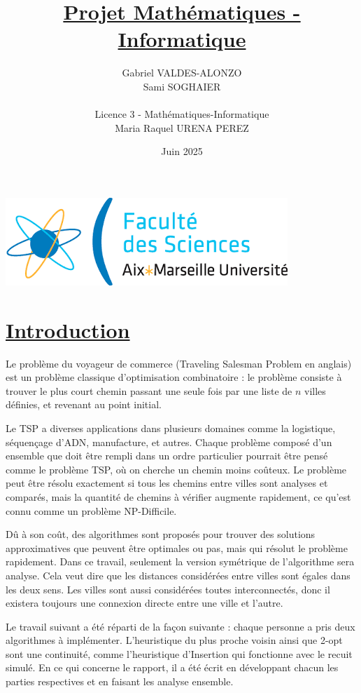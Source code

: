 \documentclass[a4paper,11pt,fleqn]{article}
\title{\underline{Projet Mathématiques - Informatique}}
\author{Gabriel VALDES-ALONZO\\ Sami SOGHAIER  \\\\ Licence 3 - Mathématiques-Informatique \\ Maria Raquel URENA PEREZ }
\date{Juin 2025}
\begin{document}
\maketitle
\begin{center}
    \includegraphics[scale=0.7]{index.png}
\end{center}

\newpage
{}

\section*{\underline{Introduction}}
Le problème du voyageur de commerce \cite{book:TSP,chap:TSP} (Traveling Salesman Problem en anglais) est un problème classique d’optimisation combinatoire : le problème consiste à trouver le plus court chemin passant une seule fois par une liste de $n$ villes définies, et revenant au point initial.

Le TSP a diverses applications dans plusieurs domaines comme la logistique, séquençage d'ADN, manufacture, et autres. Chaque problème composé d'un ensemble que doit être rempli dans un ordre particulier pourrait être pensé comme le problème TSP, où on cherche un chemin moins coûteux. Le problème peut être résolu exactement si tous les chemins entre villes sont analyses et comparés, mais la quantité de chemins à vérifier augmente rapidement, ce qu'est connu comme un problème NP-Difficile.

Dû à son coût, des algorithmes sont proposés pour trouver des solutions approximatives que peuvent être optimales ou pas, mais qui résolut le problème rapidement. Dans ce travail, seulement la version symétrique de l'algorithme sera analyse. Cela veut dire que les distances considérées entre villes sont égales dans les deux sens. Les villes sont aussi considérées toutes interconnectés, donc il existera toujours une connexion directe entre une ville et l'autre.

Le travail suivant a été réparti de la façon suivante : chaque personne a pris deux algorithmes à implémenter. L'heuristique du plus proche voisin ainsi que 2-opt sont une continuité, comme l'heuristique d'Insertion qui fonctionne avec le recuit simulé. En ce qui concerne le rapport, il a été écrit en développant chacun les parties respectives et en faisant les analyse ensemble.
\end{document}
